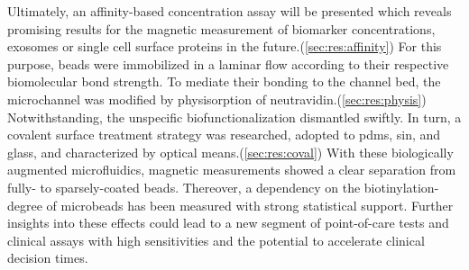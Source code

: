 Ultimately, an affinity-based concentration assay will be presented which reveals promising results for the magnetic measurement of biomarker concentrations, exosomes or single cell surface proteins in the future.(\cref{sec:res:affinity}) For this purpose, beads were immobilized in a laminar flow according to their respective biomolecular bond strength. To mediate their bonding to the channel bed, the microchannel was modified by physisorption of neutravidin.(\cref{sec:res:physis}) Notwithstanding, the unspecific biofunctionalization dismantled swiftly. In turn, a covalent surface treatment strategy was researched, adopted to \acrshort{pdms}, \acrshort{sin}, and glass, and characterized by optical means.(\cref{sec:res:coval}) With these biologically augmented microfluidics, magnetic measurements showed a clear separation from fully- to sparsely-coated beads. Thereover, a dependency on the biotinylation-degree of microbeads has been measured with strong statistical support. Further insights into these effects could lead to a new segment of point-of-care tests and clinical assays with high sensitivities and the potential to accelerate clinical decision times.


